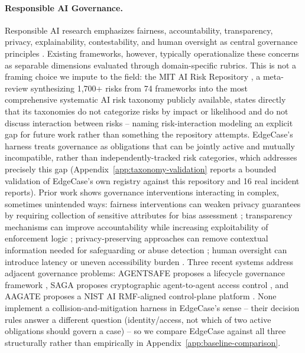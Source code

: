 \documentclass[letterpaper]{article} %
\begin{document}
\paragraph{Responsible AI Governance.} Responsible AI research emphasizes fairness, accountability, transparency, privacy, explainability, contestability, and human oversight as central governance principles \citep{barocas2016disparate,mitchell2019modelcards,dwork2014algorithmic,selbst2019fairness,raji2020closing,nist2023airmf}. Existing frameworks, however, typically operationalize these concerns as separable dimensions evaluated through domain-specific rubrics. This is not a framing choice we impute to the field: the MIT AI Risk Repository \citep{slattery2026airisk}, a meta-review synthesizing 1,700+ risks from 74 frameworks into the most comprehensive systematic AI risk taxonomy publicly available, states directly that its taxonomies do not categorize risks by impact or likelihood and do not discuss interaction between risks -- naming risk-interaction modeling an explicit gap for future work rather than something the repository attempts. EdgeCase's harness treats governance as obligations that can be jointly active and mutually incompatible, rather than independently-tracked risk categories, which addresses precisely this gap (Appendix~\ref{app:taxonomy-validation} reports a bounded validation of EdgeCase's own registry against this repository and 16 real incident reports). Prior work shows governance interventions interacting in complex, sometimes unintended ways: fairness interventions can weaken privacy guarantees by requiring collection of sensitive attributes for bias assessment \citep{jayaraman2022revisiting,selbst2019fairness}; transparency mechanisms can improve accountability while increasing exploitability of enforcement logic \citep{kroll2017accountable,carlini2023extracting}; privacy-preserving approaches can remove contextual information needed for safeguarding or abuse detection \citep{dwork2014algorithmic,whittaker2021deep}; human oversight can introduce latency or uneven accessibility burden \citep{green2019disparate}. Three recent systems address adjacent governance problems: AGENTSAFE proposes a lifecycle governance framework \citep{khan2025agentsafe}, SAGA proposes cryptographic agent-to-agent access control \citep{syros2025saga}, and AAGATE proposes a NIST AI RMF-aligned control-plane platform \citep{huang2025aagate}. None implement a collision-and-mitigation harness in EdgeCase's sense -- their decision rules answer a different question (identity/access, not which of two active obligations should govern a case) -- so we compare EdgeCase against all three structurally rather than empirically in Appendix~\ref{app:baseline-comparison}.
\end{document}
